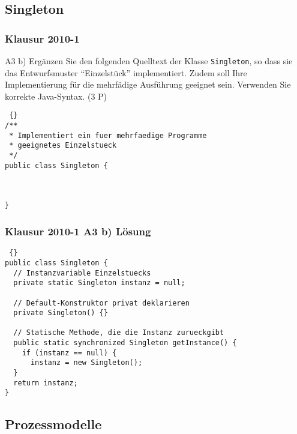 \subsection{Singleton}
\begin{frame}[fragile]
\frametitle {Klausur 2010-1} 
	\begin{block} {A3 b)}
	Ergänzen Sie den folgenden Quelltext der Klasse \texttt{Singleton}, so dass sie das Entwurfsmuster ``Einzelstück'' implementiert. Zudem soll Ihre Implementierung für die mehrfädige Ausführung geeignet sein. Verwenden Sie korrekte Java-Syntax. (3 P)
	\end{block}
	
	\begin{lstlisting} {}
/**
 * Implementiert ein fuer mehrfaedige Programme 
 * geeignetes Einzelstueck
 */
public class Singleton {



}
	\end{lstlisting}
\end{frame}

\begin{frame}[fragile]
\frametitle {Klausur 2010-1 A3 b) Lösung} 
	
	\begin{lstlisting} {}
public class Singleton {
  // Instanzvariable Einzelstuecks
  private static Singleton instanz = null;
  
  // Default-Konstruktor privat deklarieren
  private Singleton() {}
  
  // Statische Methode, die die Instanz zurueckgibt
  public static synchronized Singleton getInstance() {
    if (instanz == null) {
      instanz = new Singleton();
  }
  return instanz;
}
	\end{lstlisting}
\end{frame}


\subsection{Prozessmodelle}


